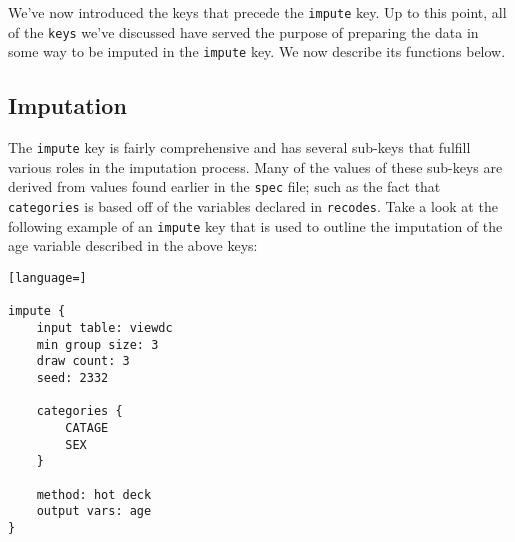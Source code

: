 \documentclass{article}
\begin{document}
We've now introduced the keys that precede the {\tt impute} key. Up to this point, all of the {\tt keys} 
we've discussed have served the purpose of preparing the data in some way to be imputed in the 
{\tt impute} key. We now describe its functions below.


\subsection{Imputation} \label{imputesec}
The {\tt impute} key is fairly comprehensive and has several sub-keys that fulfill various 
roles in the imputation process. Many of the values of these sub-keys are derived from values 
found earlier in the {\tt spec} file; such as the fact that {\tt categories} is based off of 
the variables declared in {\tt recodes}. Take a look at the following example of an {\tt impute} key 
that is used to outline the imputation of the age variable described in the above keys:

\begin{lstlisting}[language=]

impute {
    input table: viewdc
    min group size: 3
    draw count: 3
    seed: 2332

    categories {
        CATAGE
        SEX
    }

    method: hot deck
    output vars: age
}


\end{lstlisting}
\end{document}
